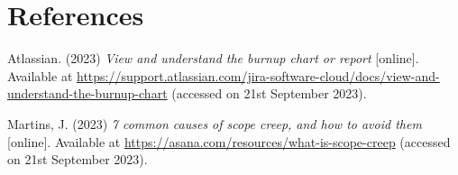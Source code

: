 \section{References}

\noindent [TODO1] Atlassian. (2023) \textit{View and understand the burnup chart or report} [online]. Available at \url{https://support.atlassian.com/jira-software-cloud/docs/view-and-understand-the-burnup-chart} (accessed on 21st September 2023).
\vspace{0.2cm}

\noindent [TODO2] Martins, J. (2023) \textit{7 common causes of scope creep, and how to avoid them} [online]. Available at \url{https://asana.com/resources/what-is-scope-creep} (accessed on 21st September 2023).
\vspace{0.2cm}

\newpage